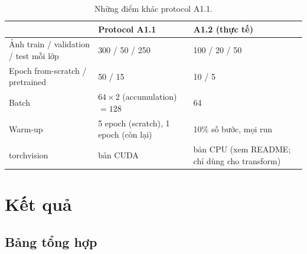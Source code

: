 \documentclass[11pt, a4paper]{article}
\begin{document}
\begin{table}[H]
  \centering
  \caption{Những điểm khác protocol A1.1.}
  \label{tab:deviations}
  \begin{tabularx}{\linewidth}{lYY}
    \toprule
    & \textbf{Protocol A1.1} & \textbf{A1.2 (thực tế)} \\
    \midrule
    Ảnh train / validation / test mỗi lớp & 300 / 50 / 250 & 100 / 20 / 50 \\
    Epoch from-scratch / pretrained & 50 / 15 & 10 / 5 \\
    Batch & $64 \times 2$ (accumulation) $= 128$ & 64 \\
    Warm-up & 5 epoch (scratch), 1 epoch (còn lại) & 10\% số bước, mọi run \\
    torchvision & bản CUDA & bản CPU (xem README; chỉ dùng cho transform) \\
    \bottomrule
  \end{tabularx}
\end{table}

\section{Kết quả}

\subsection{Bảng tổng hợp}
\end{document}
